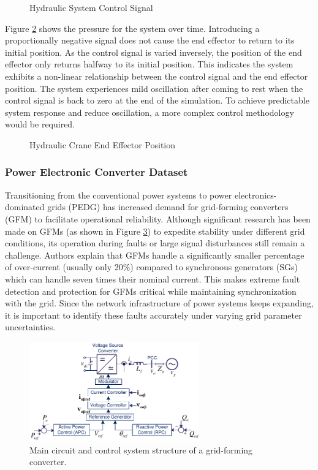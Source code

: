 \begin{figure}[H]
    
    \caption{Hydraulic System Control Signal}
    \label{fig:hydraulic_cs}
\end{figure}

Figure \ref{fig:hydraulic_pos} shows the pressure for the system over time. Introducing a proportionally negative signal does not cause the end effector to return to its initial position. As the control signal is varied inversely, the position of the end effector only returns halfway to its initial position. This indicates the system exhibits a non-linear relationship between the control signal and the end effector position.    The system experiences mild oscillation after coming to rest when the control signal is back to zero at the end of the simulation. To achieve predictable system response and reduce oscillation, a more complex control methodology would be required.

\begin{figure}[H]
    
    \caption{Hydraulic Crane End Effector Position}
    \label{fig:hydraulic_pos}
\end{figure}

\subsubsection{Power Electronic Converter Dataset}
\label{ref_pec_dataset}

Transitioning from the conventional power systems to power electronics-dominated grids (PEDG) has increased demand for grid-forming converters (GFM) to facilitate operational reliability. Although significant research has been made on GFMs (as shown in Figure \ref{fig:sys}) to expedite stability under different grid conditions, its operation during faults or large signal disturbances still remain a challenge. Authors \cite{trainsient-stability-9523750} explain that GFMs handle a significantly smaller percentage of over-current (usually only 20\%) compared to synchronous generators (SGs) which can handle seven times their nominal current. This makes extreme fault detection and protection for GFMs critical while maintaining synchronization with the grid. Since the network infrastructure of power systems keeps expanding, it is important to identify these faults accurately under varying grid parameter uncertainties.

\begin{figure}[H]
	\includegraphics[width=0.65\textwidth]{Images/GFMSchema.pdf}
	\caption{Main circuit and control system structure of a grid-forming converter.}
	\label{fig:sys}
\end{figure}

